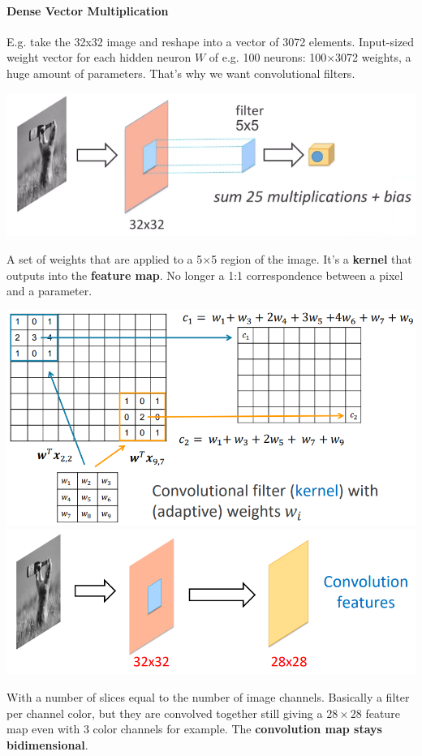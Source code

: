 \documentclass[10pt]{report}
\begin{document}
\paragraph{Dense Vector Multiplication} E.g. take the 32x32 image and reshape into a vector of 3072 elements. Input-sized weight vector for each hidden neuron $W$ of e.g. 100 neurons: 100$\times$3072 weights, a huge amount of parameters. That's why we want convolutional filters.
\begin{center}
	\includegraphics[scale=0.5]{51.png}
\end{center}
A set of weights that are applied to a 5$\times$5 region of the image. It's a \textbf{kernel} that outputs into the \textbf{feature map}. No longer a 1:1 correspondence between a pixel and a parameter.
\begin{center}
	\includegraphics[scale=0.5]{52.png}\\
	\includegraphics[scale=0.5]{53.png}
\end{center}
With a number of slices equal to the number of image channels. Basically a filter per channel color, but they are convolved together still giving a $28\times28$ feature map even with 3 color channels for example. The \textbf{convolution map stays bidimensional}.
\end{document}
